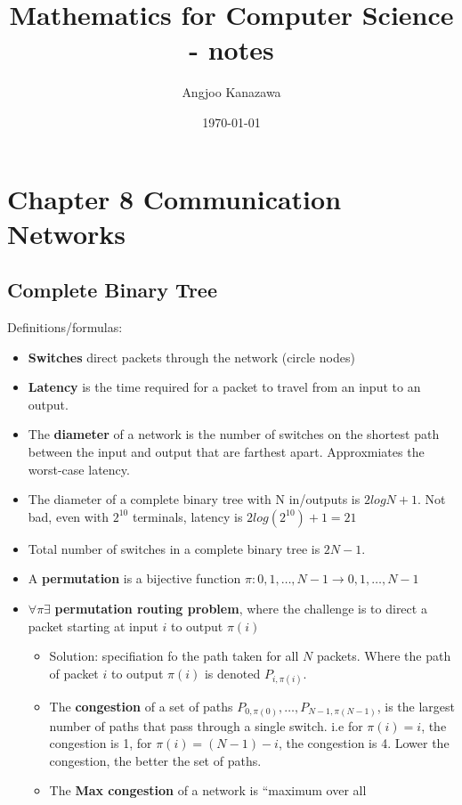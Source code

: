 \documentclass[10pt]{article}
\title{Mathematics for Computer Science - notes}
\author{Angjoo Kanazawa}
\date{\today}
\newcounter{set}
\newcommand{\ra}{\rightarrow}
\begin{document}
\maketitle \thispagestyle{empty}
\setcounter{section}{7}
\section{Chapter 8 Communication Networks}
\label{sec:chapt-8-comm}

\subsection{Complete Binary Tree}
\label{sec:complete-binary-tree}

Definitions/formulas:
\begin{itemize}
\item \textbf{Switches} direct packets through the network (circle nodes)
\item \textbf{Latency} is the time required for a packet to travel from an input to an output.
\item The \textbf{diameter} of a network is the number of switches on the shortest path between
the input and output that are farthest apart. Approxmiates the
worst-case latency.
\item The diameter of a complete binary tree with N in/outputs is
  $2logN+1$. Not bad, even with $2^{10}$ terminals, latency is
  $2log(2^{10})+1 = 21$
\item Total number of switches in a complete binary tree is $2N-1$.
\item A \textbf{permutation} is a bijective function $\pi: {0, 1,\dots, N-1} \ra
  {0, 1, \dots, N-1}$
\item $\forall \pi \exists$ \textbf{permutation routing problem},
  where the challenge is to direct a packet starting at input $i$ to
  output $\pi(i)$
  \begin{itemize}
  \item Solution: specifiation fo the path taken for all $N$
    packets. Where the path of packet $i$ to output $\pi(i)$ is
    denoted $P_{i, \pi(i)}$.
  \item The \textbf{congestion} of a set of paths $P_{0,\pi(0)},
    \dots, P_{N-1, \pi(N-1)} $, is the largest number of paths that pass
    through a single switch. i.e for $\pi(i) = i$, the congestion is 1,
    for $\pi(i) = (N-1)-i$, the congestion is 4. Lower the congestion,
    the better the set of paths.
  \item The \textbf{Max congestion} of a network is ``maximum over all

\end{itemize}
\end{itemize}
\end{document}
